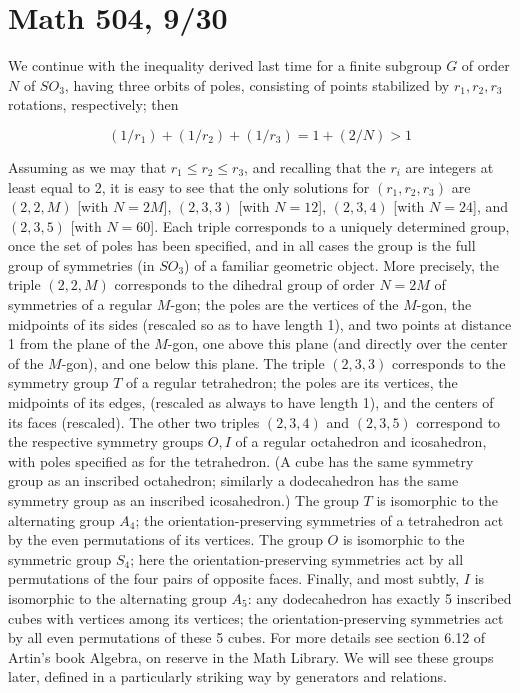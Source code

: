 \documentclass[10pt]{article}
\begin{document}
\section*{Math 504, 9/30}

We continue with the inequality derived last time for a finite subgroup
$G$ of order $N$ of $SO_3$, having three orbits of poles, consisting of
points stabilized by $r_1,r_2,r_3$ rotations, respectively; then

\[
(1/r_1) + (1/r_2) + (1/r_3) = 1 + (2/N) > 1
\]

Assuming as we may that $r_1\le r_2\le r_3$, and recalling that the
$r_i$ are integers at least equal to 2, it is easy to see that the only
solutions for $(r_1,r_2,r_3)$ are $(2,2,M)$ [with $N=2M$], $(2,3,3)$
[with $N = 12$], $(2,3,4)$ [with $N = 24$], and $(2,3,5)$ [with $N =
  60$]. Each triple corresponds to a uniquely determined group, once the
set of poles has been specified, and in all cases the group is the full
group of symmetries (in $SO_3$) of a familiar geometric object. More
precisely, the triple $(2,2,M)$ corresponds to the dihedral group of
order $N = 2M$ of symmetries of a regular $M$-gon; the poles are the
vertices of the $M$-gon, the midpoints of its sides (rescaled so as to
have length 1), and two points at distance 1 from the plane of the
$M$-gon, one above this plane (and directly over the center of the
$M$-gon), and one below this plane. The triple $(2,3,3)$ corresponds to
the symmetry group $T$ of a regular tetrahedron; the poles are its
vertices, the midpoints of its edges, (rescaled as always to have length
1), and the centers of its faces (rescaled). The other two triples
$(2,3,4)$ and $(2,3,5)$ correspond to the respective symmetry groups
$O,I$ of a regular octahedron and icosahedron, with poles specified as
for the tetrahedron. (A cube has the same symmetry group as an inscribed
octahedron; similarly a dodecahedron has the same symmetry group as an
inscribed icosahedron.) The group $T$ is isomorphic to the alternating
group $A_4$; the orientation-preserving symmetries of a tetrahedron act
by the even permutations of its vertices. The group $O$ is isomorphic to
the symmetric group $S_4$; here the orientation-preserving symmetries
act by all permutations of the four pairs of opposite faces. Finally,
and most subtly, $I$ is isomorphic to the alternating group $A_5$: any
dodecahedron has exactly 5 inscribed cubes with vertices among its
vertices; the orientation-preserving symmetries act by all even
permutations of these 5 cubes. For more details see section 6.12 of
Artin's book Algebra, on reserve in the Math Library. We will see these
groups later, defined in a particularly striking way by generators and
relations.
\end{document}
